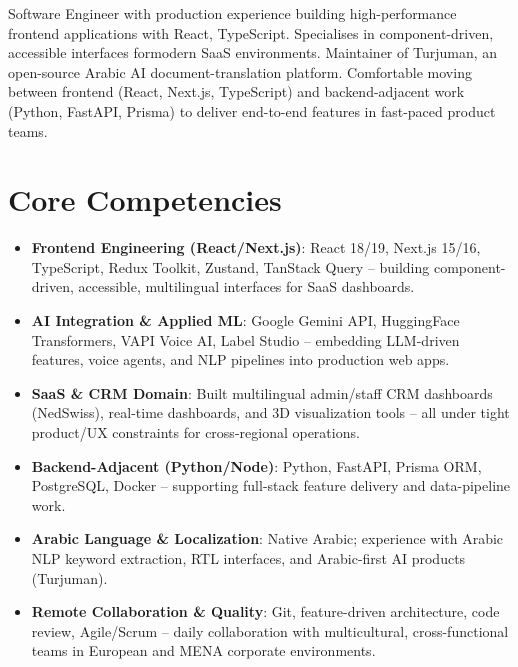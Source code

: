 \documentclass[11pt,a4paper,sans]{moderncv}
\begin{document}
\makecvtitle

\vspace{6pt}
\small{Software Engineer with production experience building high-performance frontend applications with React, TypeScript. Specialises in component-driven, accessible interfaces formodern SaaS environments. Maintainer of Turjuman, an open-source Arabic AI document-translation platform. Comfortable moving between frontend (React, Next.js, TypeScript) and backend-adjacent work (Python, FastAPI, Prisma) to deliver end-to-end features in fast-paced product teams.}

\section{Core Competencies}
\vspace{1pt}
\begin{itemize}

\item \textbf{Frontend Engineering (React/Next.js)}: React 18/19, Next.js 15/16, TypeScript, Redux Toolkit, Zustand, TanStack Query -- building component-driven, accessible, multilingual interfaces for SaaS dashboards.

\item \textbf{AI Integration \& Applied ML}: Google Gemini API, HuggingFace Transformers, VAPI Voice AI, Label Studio -- embedding LLM-driven features, voice agents, and NLP pipelines into production web apps.

\item \textbf{SaaS \& CRM Domain}: Built multilingual admin/staff CRM dashboards (NedSwiss), real-time dashboards, and 3D visualization tools -- all under tight product/UX constraints for cross-regional operations.

\item \textbf{Backend-Adjacent (Python/Node)}: Python, FastAPI, Prisma ORM, PostgreSQL, Docker -- supporting full-stack feature delivery and data-pipeline work.

\item \textbf{Arabic Language \& Localization}: Native Arabic; experience with Arabic NLP keyword extraction, RTL interfaces, and Arabic-first AI products (Turjuman).

\item \textbf{Remote Collaboration \& Quality}: Git, feature-driven architecture, code review, Agile/Scrum -- daily collaboration with multicultural, cross-functional teams in European and MENA corporate environments.

\end{itemize}
\end{document}
